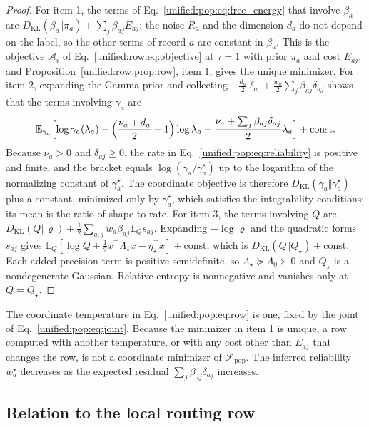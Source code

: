 \documentclass[11pt]{article}
\theoremstyle{definition}
\theoremstyle{remark}
\providecommand{\KL}{D_{\mathrm{KL}}}
\providecommand{\E}{\mathbb{E}}
\providecommand{\F}{\mathcal{F}}
\begin{document}
\begin{proof}
For item 1, the terms of Eq.~\eqref{unified:pop:eq:free_energy} that involve $\beta_a$ are $\KL(\beta_a\Vert\pi_a)+\sum_j\beta_{aj}E_{aj}$; the noise $R_a$ and the dimension $d_a$ do not depend on the label, so the other terms of record $a$ are constant in $\beta_a$. This is the objective $\mathcal A_i$ of Eq.~\eqref{unified:row:eq:objective} at $\tau=1$ with prior $\pi_a$ and cost $E_{aj}$, and Proposition~\ref{unified:row:prop:row}, item 1, gives the unique minimizer. For item 2, expanding the Gamma prior and collecting $-\tfrac{d_a}{2}\ell_a+\tfrac{w_a}{2}\sum_j\beta_{aj}\delta_{aj}$ shows that the terms involving $\gamma_a$ are
\[
\E_{\gamma_a}\Bigl[\log\gamma_a(\lambda_a)-\Bigl(\frac{\nu_a+d_a}{2}-1\Bigr)\log\lambda_a+\frac{\nu_a+\sum_j\beta_{aj}\delta_{aj}}{2}\lambda_a\Bigr]+\text{const}.
\]
Because $\nu_a>0$ and $\delta_{aj}\ge0$, the rate in Eq.~\eqref{unified:pop:eq:reliability} is positive and finite, and the bracket equals $\log(\gamma_a/\gamma_a^\star)$ up to the logarithm of the normalizing constant of $\gamma_a^\star$. The coordinate objective is therefore $\KL(\gamma_a\Vert\gamma_a^\star)$ plus a constant, minimized only by $\gamma_a^\star$, which satisfies the integrability conditions; its mean is the ratio of shape to rate. For item 3, the terms involving $Q$ are $\KL(Q\Vert\varrho)+\tfrac12\sum_{a,j}w_a\beta_{aj}\E_Qs_{aj}$. Expanding $-\log\varrho$ and the quadratic forms $s_{aj}$ gives $\E_Q[\log Q+\tfrac12x^\top\Lambda_\star x-\eta_\star^\top x]+\text{const}$, which is $\KL(Q\Vert Q_\star)+\text{const}$. Each added precision term is positive semidefinite, so $\Lambda_\star\succeq\Lambda_0\succ0$ and $Q_\star$ is a nondegenerate Gaussian. Relative entropy is nonnegative and vanishes only at $Q=Q_\star$.
\end{proof}

The coordinate temperature in Eq.~\eqref{unified:pop:eq:row} is one, fixed by the joint of Eq.~\eqref{unified:pop:eq:joint}. Because the minimizer in item 1 is unique, a row computed with another temperature, or with any cost other than $E_{aj}$ that changes the row, is not a coordinate minimizer of $\F_{\mathrm{pop}}$. The inferred reliability $w_a^\star$ decreases as the expected residual $\sum_j\beta_{aj}\delta_{aj}$ increases.

\subsection{Relation to the local routing row}
\end{document}
